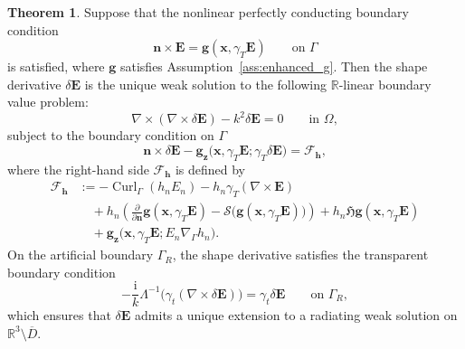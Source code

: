 \documentclass[12pt,reqno]{amsart}
\theoremstyle{definition}
\newtheorem{theo}{Theorem}[section]
\numberwithin{equation}{section}
\begin{document}
\begin{theo}\label{th:shape_derivative_npec}
Suppose that the nonlinear perfectly conducting boundary condition
\[
\mathbf{n} \times \mathbf{E} = \mathbf{g}(\boldsymbol{x}, \gamma_T \mathbf{E}) \qquad \text{on } \Gamma
\]
is satisfied, where \(\mathbf{g}\) satisfies Assumption~\ref{ass:enhanced_g}. 
Then the shape derivative \(\delta \mathbf{E}\) is the unique weak solution to the following \(\mathbb{R}\)-linear boundary value problem:
\begin{equation*}
\nabla \times (\nabla \times \delta \mathbf{E}) - k^2 \delta \mathbf{E} = 0 \qquad \text{in } \Omega,
\end{equation*}
subject to the boundary condition on \(\Gamma\)
\begin{equation}
\label{eq:shape_npec}
\mathbf{n} \times \delta \mathbf{E} - \mathbf{g}_{\boldsymbol{z}} \bigl( \boldsymbol{x}, \gamma_T \mathbf{E}; \gamma_T \delta \mathbf{E} \bigr) = \mathcal{F}_{\mathbf{h}},
\end{equation}
where the right-hand side \(\mathcal{F}_{\mathbf{h}}\) is defined by
\begin{equation}
\label{eq:npec_shape_rhs}
\begin{aligned}
\mathcal{F}_{\mathbf{h}} &:= -\operatorname{Curl}_\Gamma (h_n E_n) - h_n \gamma_T(\nabla \times \mathbf{E}) \\
&\quad + h_n \left( \frac{\partial}{\partial \mathbf{n}} \mathbf{g}(\boldsymbol{x}, \gamma_T \mathbf{E}) - \mathcal{S} \bigl( \mathbf{g}(\boldsymbol{x}, \gamma_T \mathbf{E}) \bigr) \right) + h_n \mathfrak{H} \mathbf{g}(\boldsymbol{x}, \gamma_T \mathbf{E}) \\
&\quad + \mathbf{g}_{\boldsymbol{z}} \bigl( \boldsymbol{x}, \gamma_T \mathbf{E}; E_n \nabla_\Gamma h_n \bigr).
\end{aligned}
\end{equation}
On the artificial boundary \(\Gamma_R\), the shape derivative satisfies the transparent boundary condition
\begin{equation}
\label{eq:npec_shape_radiation}
-\frac{\mathrm{i}}{k} \Lambda^{-1} \bigl( \gamma_t(\nabla \times \delta \mathbf{E}) \bigr) = \gamma_t \delta \mathbf{E} \qquad \text{on } \Gamma_R,
\end{equation}
which ensures that \(\delta \mathbf{E}\) admits a unique extension to a radiating weak solution on \(\mathbb{R}^3 \setminus \overline{D}\). 
\end{theo}
\end{document}
